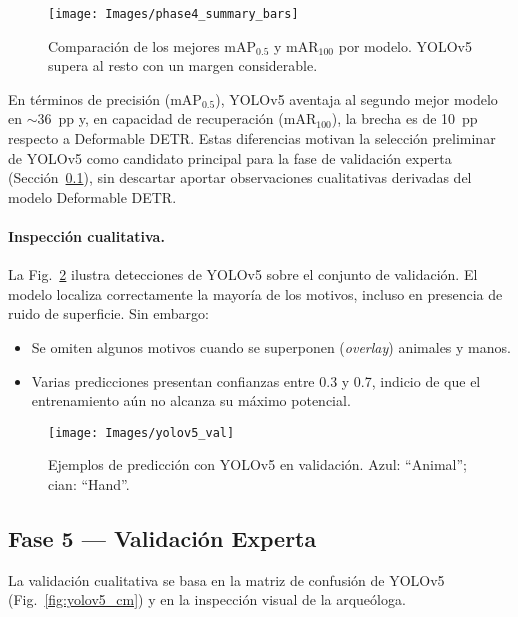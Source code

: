 

\begin{figure}[!ht]
  \centering
  \texttt{[image: Images/phase4\_summary\_bars]}
  \caption{Comparación de los mejores mAP\(_{0.5}\) y mAR\(_{100}\)
           por modelo.  YOLOv5 supera al resto con un margen
           considerable.}
  \label{fig:phase4_bars}
\end{figure}

En términos de precisión (mAP\(_{0.5}\)), YOLOv5 aventaja al segundo mejor modelo en \(\sim\)36~pp y,
en capacidad de recuperación (mAR\(_{100}\)), la brecha es de 10~pp respecto a Deformable DETR.
Estas diferencias motivan la selección preliminar de YOLOv5 como candidato principal para la fase de validación experta
(Sección~\ref{ssec:fase5_experta}), sin descartar aportar observaciones cualitativas derivadas del modelo Deformable DETR.

\paragraph{Inspección cualitativa.}
La Fig.~\ref{fig:yolov5_val} ilustra detecciones de YOLOv5 sobre el conjunto de validación.
El modelo localiza correctamente la mayoría de los motivos, incluso en presencia de ruido de superficie.
Sin embargo:

\begin{itemize}
  \item Se omiten algunos motivos cuando se superponen (\emph{overlay}) animales y manos.
  \item Varias predicciones presentan confianzas entre 0.3 y 0.7, indicio de que el entrenamiento aún no alcanza su máximo potencial.
\end{itemize}

\begin{figure}[!ht]
  \centering
  \texttt{[image: Images/yolov5\_val]}
  \caption{Ejemplos de predicción con YOLOv5 en validación. Azul: “Animal”; cian: “Hand”.}
  \label{fig:yolov5_val}
\end{figure}

\subsection{Fase 5 — Validación Experta}
\label{ssec:fase5_experta}

La validación cualitativa se basa en la matriz de confusión de YOLOv5 (Fig.~\ref{fig:yolov5_cm}) y en la inspección visual de la arqueóloga.

